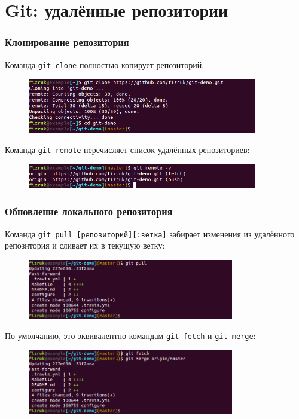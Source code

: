 \documentclass{beamer}
\begin{document}
\section{Git: удалённые репозитории}

\begin{frame}
  \frametitle{Клонирование репозитория}
  Команда \texttt{git clone} полностью копирует репозиторий.

  \begin{figure}
    \includegraphics[width=10cm]{images/git-clone.png}
  \end{figure}

  Команда \texttt{git remote} перечисляет список удалённых репозиториев:

  \begin{figure}
    \includegraphics[width=10cm]{images/git-remote.png}
  \end{figure}
\end{frame}

\begin{frame}
  \frametitle{Обновление локального репозитория}
  Команда \texttt{git pull [репозиторий][:ветка]} забирает изменения из 
  удалённого репозитория и сливает их в текущую ветку:

  \begin{figure}
    \includegraphics[width=9cm]{images/git-pull.png}
  \end{figure}

  По умолчанию, это эквивалентно командам \texttt{git fetch} и \texttt{git merge}:

  \begin{figure}
    \includegraphics[width=9cm]{images/git-fetch-merge.png}
  \end{figure}
\end{frame}
\end{document}
